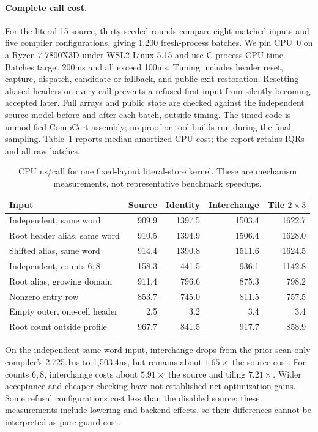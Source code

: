 \paragraph{Complete call cost.}
For the literal-15 source, thirty seeded rounds compare eight matched inputs
and five compiler configurations, giving 1,200 fresh-process batches. We pin
CPU~0 on a Ryzen 7 7800X3D under WSL2 Linux 5.15 and use C  process
CPU time. Batches target 200ms and all exceed 100ms. Timing includes header reset,
capture, dispatch, candidate or fallback, and public-exit restoration. Resetting
aliased headers on every call prevents a refused first input from silently
becoming accepted later. Full arrays and public state are checked against the
independent source model before and after each batch, outside timing.
The timed code is unmodified CompCert assembly; no proof or tool builds run
during the final sampling. Table~\ref{tab:nested-cost} reports median amortized
CPU cost; the report retains IQRs and all raw batches.

\begin{table}[t]
\centering
\caption{CPU ns/call for one fixed-layout literal-store kernel. These are
mechanism measurements, not representative benchmark speedups.}
\label{tab:nested-cost}
\begin{tabular}{lrrrr}
\hline
Input & Source & Identity & Interchange & Tile $2\times3$\\
\hline
Independent, same word & 909.9 & 1397.5 & 1503.4 & 1622.7\\
Root header alias, same word & 910.5 & 1394.9 & 1506.4 & 1628.0\\
Shifted alias, same word & 914.4 & 1390.8 & 1511.6 & 1624.5\\
Independent, counts $6,8$ & 158.3 & 441.5 & 936.1 & 1142.8\\
Root alias, growing domain & 911.4 & 796.6 & 875.3 & 798.2\\
Nonzero entry row & 853.7 & 745.0 & 811.5 & 757.5\\
Empty outer, one-cell header & 2.5 & 3.2 & 3.4 & 3.4\\
Root count outside profile & 967.7 & 841.5 & 917.7 & 858.9\\
\hline
\end{tabular}
\end{table}

On the independent same-word input, interchange drops from the prior
scan-only compiler's 2,725.1ns to 1,503.4ns, but remains about $1.65\times$
the source cost. For counts $6,8$, interchange costs about $5.91\times$ the
source and tiling $7.21\times$. Wider acceptance and cheaper checking have not
established net optimization gains. Some refusal configurations cost less than
the disabled source; these measurements include lowering and backend effects,
so their differences cannot be interpreted as pure guard cost.

